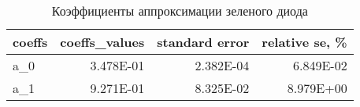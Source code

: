\begin{table}[H]
\centering
\caption{Коэффициенты аппроксимации зеленого диода}
\label{coeffs_table}
\begin{tabular}{lrrr}
\toprule
coeffs &  coeffs\_values &  standard error &  relative se, \% \\
\midrule
   a\_0 &      3.478E-01 &       2.382E-04 &       6.849E-02 \\
   a\_1 &      9.271E-01 &       8.325E-02 &       8.979E+00 \\
\bottomrule
\end{tabular}
\end{table}
